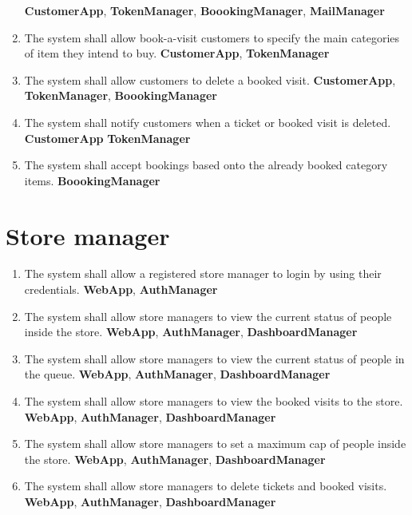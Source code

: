 \begin{enumerate}[series=requirements, label=\textbf{R.\arabic*}]
	\newline\textbf{CustomerApp}, \textbf{TokenManager}, \textbf{BoookingManager}, \textbf{MailManager}
	\item The system shall allow book-a-visit customers to specify the main categories of item they intend to buy.
	\newline\textbf{CustomerApp}, \textbf{TokenManager}
	\item The system shall allow customers to delete a booked visit.
	\newline\textbf{CustomerApp}, \textbf{TokenManager}, \textbf{BoookingManager}
	\item The system shall notify customers when a ticket or booked visit is deleted.
	\newline\textbf{CustomerApp} \textbf{TokenManager}
	\item The system shall accept bookings based onto the already booked category items.
	\newline\textbf{BoookingManager}
\end{enumerate}

\section{Store manager}
\begin{enumerate}[resume*=requirements]
	\item The system shall allow a registered store manager to login by using their credentials.
	\newline\textbf{WebApp}, \textbf{AuthManager}
	\item The system shall allow store managers to view the current status of people inside the store.
	\newline\textbf{WebApp}, \textbf{AuthManager}, \textbf{DashboardManager}
	\item The system shall allow store managers to view the current status of people in the queue.
	\newline\textbf{WebApp}, \textbf{AuthManager}, \textbf{DashboardManager}
	\item The system shall allow store managers to view the booked visits to the store.
	\newline\textbf{WebApp}, \textbf{AuthManager}, \textbf{DashboardManager}
	\item The system shall allow store managers to set a maximum cap of people inside the store.
	\newline\textbf{WebApp}, \textbf{AuthManager}, \textbf{DashboardManager}
	\item The system shall allow store managers to delete tickets and booked visits.
	\newline\textbf{WebApp}, \textbf{AuthManager}, \textbf{DashboardManager}
\end{enumerate}

